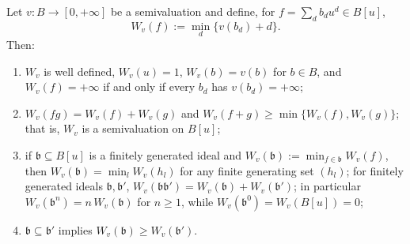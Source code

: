 \begin{lemma}
\label{lem:ch44-gauss-valuation}
Let $v:B\to[0,+\infty]$ be a semivaluation and define, for
$f=\sum_db_du^d\in B[u]$,
\[
 W_v(f):=\min_d\{v(b_d)+d\}.
\]
Then:
\begin{enumerate}
\item\label{itm:ch44-gauss:well}
      $W_v$ is well defined, $W_v(u)=1$, $W_v(b)=v(b)$ for $b\in B$,
      and $W_v(f)=+\infty$ if and only if every $b_d$ has
      $v(b_d)=+\infty$;
\item\label{itm:ch44-gauss:val}
      $W_v(fg)=W_v(f)+W_v(g)$ and
      $W_v(f+g)\ge\min\{W_v(f),W_v(g)\}$; that is, $W_v$ is a
      semivaluation on $B[u]$;
\item\label{itm:ch44-gauss:ideal}
      if $\mathfrak b\subseteq B[u]$ is a finitely generated ideal and
      $W_v(\mathfrak b):=\min_{f\in\mathfrak b}W_v(f)$, then
      $W_v(\mathfrak b)=\min_lW_v(h_l)$ for any finite generating set
      $(h_l)$; for finitely generated ideals $\mathfrak b,\mathfrak b'$,
      $W_v(\mathfrak b\mathfrak b')=W_v(\mathfrak b)+W_v(\mathfrak b')$;
      in particular $W_v(\mathfrak b^n)=n\,W_v(\mathfrak b)$ for
      $n\ge1$, while $W_v(\mathfrak b^0)=W_v(B[u])=0$;
\item\label{itm:ch44-gauss:mono}
      $\mathfrak b\subseteq\mathfrak b'$ implies
      $W_v(\mathfrak b)\ge W_v(\mathfrak b')$.
\end{enumerate}
\end{lemma}

